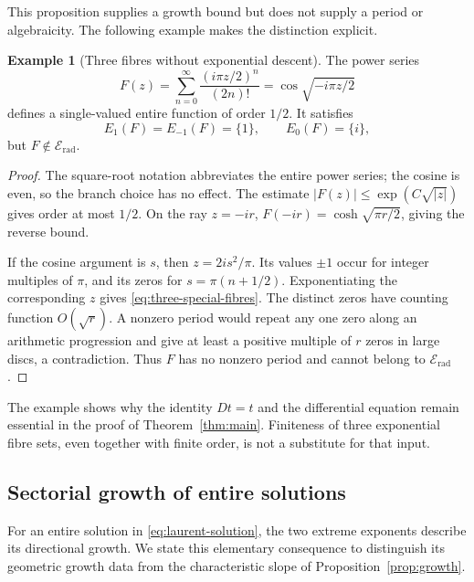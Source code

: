 \documentclass[11pt,reqno]{amsart}
\numberwithin{equation}{section}
\theoremstyle{definition}
\newtheorem{example}[theorem]{Example}
\theoremstyle{remark}
\newcommand{\Erad}{\mathscr E_{\mathrm{rad}}}
\begin{document}
This proposition supplies a growth bound but does not supply a period
or algebraicity. The following example makes the distinction explicit.

\begin{example}[Three fibres without exponential descent]
\label{ex:three-fibres}
The power series
\begin{equation}
 F(z)=\sum_{n=0}^{\infty}\frac{(i\pi z/2)^n}{(2n)!}
     =\cos\sqrt{-i\pi z/2}
 \label{eq:cosine-root}
\end{equation}
defines a single-valued entire function of order $1/2$. It satisfies
\begin{equation}
 E_1(F)=E_{-1}(F)=\{1\},\qquad E_0(F)=\{i\},
 \label{eq:three-special-fibres}
\end{equation}
but $F\notin\Erad$.
\end{example}

\begin{proof}
The square-root notation abbreviates the entire power series; the
cosine is even, so the branch choice has no effect. The estimate
$|F(z)|\leq\exp(C\sqrt{|z|})$ gives order at most $1/2$. On the
ray $z=-ir$, $F(-ir)=\cosh\sqrt{\pi r/2}$, giving the reverse
bound.

If the cosine argument is $s$, then $z=2is^2/\pi$. Its values
$\pm1$ occur for integer multiples of $\pi$, and its zeros for
$s=\pi(n+1/2)$. Exponentiating the corresponding $z$ gives
\eqref{eq:three-special-fibres}. The distinct zeros have counting
function $O(\sqrt r)$. A nonzero period would repeat any one zero
along an arithmetic progression and give at least a positive
multiple of $r$ zeros in large discs, a contradiction. Thus $F$
has no nonzero period and cannot belong to $\Erad$.
\end{proof}

The example shows why the identity $Dt=t$ and the differential
equation remain essential in the proof of
Theorem~\ref{thm:main}. Finiteness of three exponential fibre sets,
even together with finite order, is not a substitute for that input.

\subsection{Sectorial growth of entire solutions}

For an entire solution in \eqref{eq:laurent-solution}, the two
extreme exponents describe its directional growth. We state this
elementary consequence to distinguish its geometric growth data
from the characteristic slope of Proposition~\ref{prop:growth}.
\end{document}
